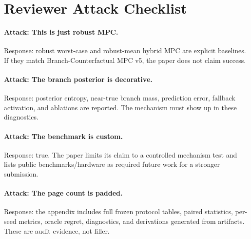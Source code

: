 \documentclass{article}
\newcommand{\methodv}{Branch-Counterfactual MPC v5}
\begin{document}
\section{Reviewer Attack Checklist}

\paragraph{Attack: This is just robust MPC.}
Response: robust worst-case and robust-mean hybrid MPC are explicit baselines.  If they match \methodv{}, the paper does not claim success.

\paragraph{Attack: The branch posterior is decorative.}
Response: posterior entropy, near-true branch mass, prediction error, fallback activation, and ablations are reported.  The mechanism must show up in these diagnostics.

\paragraph{Attack: The benchmark is custom.}
Response: true.  The paper limits its claim to a controlled mechanism test and lists public benchmarks/hardware as required future work for a stronger submission.

\paragraph{Attack: The page count is padded.}
Response: the appendix includes full frozen protocol tables, paired statistics, per-seed metrics, oracle regret, diagnostics, and derivations generated from artifacts.  These are audit evidence, not filler.





\end{document}
